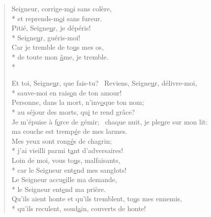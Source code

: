 
\begin{verse}
Seigneur, corrige-m\underline{o}i sans colère, \\*
et reprends-m\underline{o}i sans fureur. \\
Pitié, Seigne\underline{u}r, je dépéris! \\*
Seigne\underline{u}r, guéris-moi! \\
Car je tremble de to\underline{u}s mes os, \\*
de toute mon \underline{â}me, je tremble. \\*

Et toi, Seigne\underline{u}r, que fais-tu?~\psalmdagger
{}Reviens, Seigne\underline{u}r, délivre-moi, \\*
sauve-moi en rais\underline{o}n de ton amour! \\
Personne, dans la mort, n’inv\underline{o}que ton nom; \\*
au séjour des morts, qu\underline{i} te rend grâce? \\

Je m’épuise à f\underline{o}rce de gémir;~\psalmdagger
chaque nuit, je ple\underline{u}re sur mon lit: \\
ma couche est tremp\underline{é}e de mes larmes. \\
Mes yeux sont rong\underline{é}s de chagrin; \\*
j’ai vieilli parmi t\underline{a}nt d’adversaires! \\

Loin de moi, vous to\underline{u}s, malfaisants, \\*
car le Seigneur ent\underline{e}nd mes sanglots! \\
Le Seigneur accu\underline{e}ille ma demande, \\*
le Seigneur ent\underline{e}nd ma prière. \\
Qu’ils aient honte et qu’ils tremblent, to\underline{u}s mes ennemis, \\*
qu’ils reculent, soud\underline{a}in, couverts de honte! \\
\end{verse}

